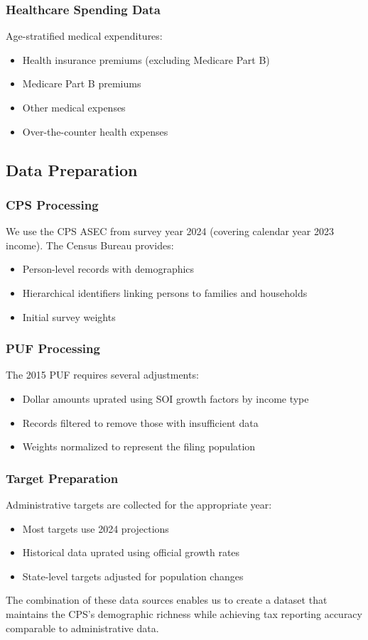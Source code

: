 \subsubsection{Healthcare Spending Data}

Age-stratified medical expenditures:
\begin{itemize}
\item Health insurance premiums (excluding Medicare Part B)
\item Medicare Part B premiums
\item Other medical expenses
\item Over-the-counter health expenses
\end{itemize}

\subsection{Data Preparation}

\subsubsection{CPS Processing}

We use the CPS ASEC from survey year 2024 (covering calendar year 2023 income). The Census Bureau provides:
\begin{itemize}
\item Person-level records with demographics
\item Hierarchical identifiers linking persons to families and households
\item Initial survey weights
\end{itemize}

\subsubsection{PUF Processing}

The 2015 PUF requires several adjustments:
\begin{itemize}
\item Dollar amounts uprated using SOI growth factors by income type
\item Records filtered to remove those with insufficient data
\item Weights normalized to represent the filing population
\end{itemize}

\subsubsection{Target Preparation}

Administrative targets are collected for the appropriate year:
\begin{itemize}
\item Most targets use 2024 projections
\item Historical data uprated using official growth rates
\item State-level targets adjusted for population changes
\end{itemize}

The combination of these data sources enables us to create a dataset that maintains the CPS's demographic richness while achieving tax reporting accuracy comparable to administrative data.